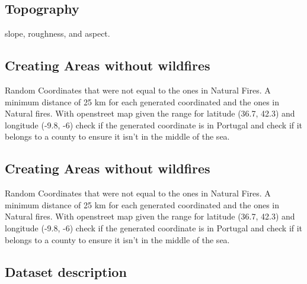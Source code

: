 \subsection{Topography}

slope, roughness, and aspect.


























\subsection{Creating Areas without wildfires}

Random Coordinates that were not equal to the ones in Natural Fires. A minimum distance of 25 km for each generated coordinated and the ones in Natural fires. With openstreet map given the range for latitude (36.7, 42.3) and longitude (-9.8, -6) check if the generated coordinate is in Portugal and check if it belongs to a county to ensure it isn't in the middle of the sea.








\subsection{Creating Areas without wildfires}

Random Coordinates that were not equal to the ones in Natural Fires. A minimum distance of 25 km for each generated coordinated and the ones in Natural fires. With openstreet map given the range for latitude (36.7, 42.3) and longitude (-9.8, -6) check if the generated coordinate is in Portugal and check if it belongs to a county to ensure it isn't in the middle of the sea.

\subsection{Dataset description}







